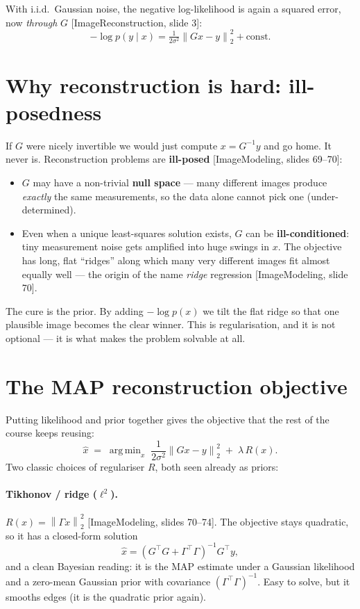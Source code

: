 \documentclass[11pt]{article}
\newcommand{\xhat}{\hat{x}}
\newcommand{\norm}[1]{\left\lVert #1 \right\rVert}
\newcommand{\deck}[1]{\textsf{\small[#1]}}
\DeclareMathOperator*{\argmin}{arg\,min}
\begin{document}
With i.i.d.\ Gaussian noise, the negative log-likelihood is again a squared
error, now \emph{through} $G$ \deck{ImageReconstruction, slide 3}:
\[
-\log p(y\mid x) = \tfrac{1}{2\sigma^2}\norm{Gx - y}_2^2 + \text{const}.
\]

\section{Why reconstruction is hard: ill-posedness}

If $G$ were nicely invertible we would just compute $x = G^{-1}y$ and go home.
It never is. Reconstruction problems are \textbf{ill-posed}
\deck{ImageModeling, slides 69--70}:
\begin{itemize}[nosep,leftmargin=*]
  \item $G$ may have a non-trivial \textbf{null space} --- many different images
  produce \emph{exactly} the same measurements, so the data alone cannot pick
  one (under-determined).
  \item Even when a unique least-squares solution exists, $G$ can be
  \textbf{ill-conditioned}: tiny measurement noise gets amplified into huge
  swings in $x$. The objective has long, flat ``ridges'' along which many very
  different images fit almost equally well --- the origin of the name
  \emph{ridge} regression \deck{ImageModeling, slide 70}.
\end{itemize}
The cure is the prior. By adding $-\log p(x)$ we tilt the flat ridge so that one
plausible image becomes the clear winner. This is regularisation, and it is not
optional --- it is what makes the problem solvable at all.

\section{The MAP reconstruction objective}

Putting likelihood and prior together gives the objective that the rest of the
course keeps reusing:
\[
\xhat \;=\; \argmin_x\; \frac{1}{2\sigma^2}\norm{Gx-y}_2^2 \;+\; \lambda\,R(x).
\]
Two classic choices of regulariser $R$, both seen already as priors:

\paragraph{Tikhonov / ridge ($\ell^2$).} $R(x)=\norm{\Gamma x}_2^2$
\deck{ImageModeling, slides 70--74}. The objective stays quadratic, so it has a
closed-form solution
\[
\xhat = (G^{\!\top}G + \Gamma^{\!\top}\Gamma)^{-1} G^{\!\top} y,
\]
and a clean Bayesian reading: it is the MAP estimate under a Gaussian
likelihood and a zero-mean Gaussian prior with covariance
$(\Gamma^{\!\top}\Gamma)^{-1}$. Easy to solve, but it smooths edges (it is the
quadratic prior again).
\end{document}
